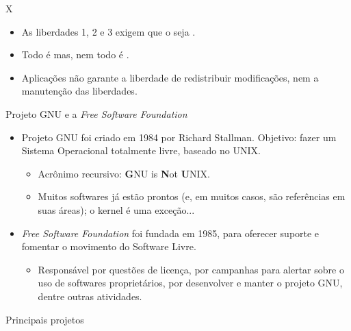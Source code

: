 \documentclass{beamer}
\begin{document}
\begin{frame}{\softwarelivre X \opensource}
   \begin{itemize}
     \item As liberdades 1, 2 e 3 exigem que o \softwarelivre seja \opensource.
        \item Todo \softwarelivre é \opensource mas, nem todo \opensource é
          \softwarelivre.
        \item Aplicações \opensource não garante a liberdade de redistribuir
          modificações, nem a manutenção das liberdades.
   \end{itemize}
\end{frame}

\begin{frame}{Projeto GNU e a \emph{Free Software Foundation}}
    \begin{itemize}
        \item{Projeto GNU foi criado em 1984 por Richard Stallman.
          Objetivo: fazer um Sistema Operacional totalmente livre,
          baseado no UNIX.}
	\begin{itemize}
	    \item{Acrônimo recursivo: \textbf{G}NU is \textbf{N}ot
               \textbf{U}NIX.}
	    \item{Muitos softwares já estão prontos (e, em muitos casos,
               são referências em suas áreas); o kernel é uma exceção...}
	\end{itemize}
	\item{\emph{Free Software Foundation} foi fundada em 1985, para
           oferecer suporte e fomentar o movimento do Software Livre.}
        \begin{itemize}
	    \item{Responsável por questões de licença, por campanhas para
               alertar sobre o uso de softwares proprietários, por
               desenvolver e manter o projeto GNU, dentre outras atividades.}
	\end{itemize}
    \end{itemize}
\end{frame}

\begin{frame}{Principais projetos}
\end{frame}
\end{document}
